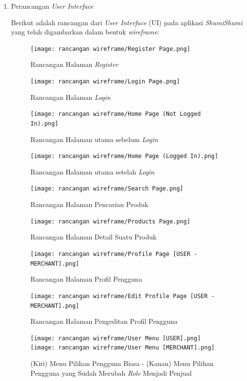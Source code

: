 \documentclass[a4paper]{article}
\begin{document}
\begin{enumerate}
    \item Perancangan \textit{User Interface}
    
    Berikut adalah rancangan dari \textit{User Interface} (UI) pada aplikasi \textit{ShumiShumi} yang telah digambarkan dalam bentuk \textit{wireframe}:

    \begin{figure}[h]
        \centering
        \texttt{[image: rancangan wireframe/Register Page.png]}
        \caption{Rancangan Halaman \textit{Register}}
    \end{figure}

    \begin{figure}[h]
        \centering
        \texttt{[image: rancangan wireframe/Login Page.png]}
        \caption{Rancangan Halaman \textit{Login}}
    \end{figure}
    \newpage
    \begin{figure}[h]
        \centering
        \texttt{[image: rancangan wireframe/Home Page (Not Logged In).png]}
        \caption{Rancangan Halaman utama sebelum \textit{Login}}
    \end{figure}
    
    \begin{figure}[h]
        \centering
        \texttt{[image: rancangan wireframe/Home Page (Logged In).png]}
        \caption{Rancangan Halaman utama setelah \textit{Login}}
    \end{figure}
    \newpage
    \begin{figure}[h]
        \centering
        \texttt{[image: rancangan wireframe/Search Page.png]}
        \caption{Rancangan Halaman Pencarian Produk}
    \end{figure}

    \begin{figure}[h]
        \centering
        \texttt{[image: rancangan wireframe/Products Page.png]}
        \caption{Rancangan Halaman Detail Suatu Produk}
    \end{figure}
    \newpage
    \begin{figure}[h]
        \centering
        \texttt{[image: rancangan wireframe/Profile Page [USER - MERCHANT].png]}
        \caption{Rancangan Halaman Profil Pengguna}
    \end{figure}

    \begin{figure}[h]
        \centering
        \texttt{[image: rancangan wireframe/Edit Profile Page [USER - MERCHANT].png]}
        \caption{Rancangan Halaman Pengeditan Profil Pengguna}
    \end{figure}
    \newpage
    \begin{figure}[h]
        \centering
        \texttt{[image: rancangan wireframe/User Menu [USER].png]}\hfill
        \texttt{[image: rancangan wireframe/User Menu [MERCHANT].png]}
        \caption{(Kiri) Menu Pilihan Pengguna Biasa - (Kanan) Menu Pilihan Pengguna yang Sudah Merubah \textit{Role} Menjadi Penjual}
    \end{figure}


\end{enumerate}
\end{document}

